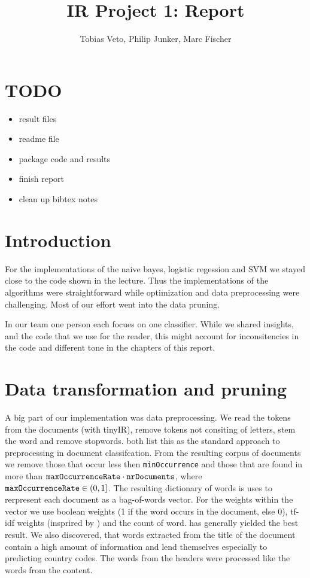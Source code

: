 \documentclass{article}
\title{IR Project 1: Report}
\author{Tobias Veto, Philip Junker, Marc Fischer}
\begin{document}
\section*{TODO}
\begin{itemize}
	\item result files
	\item readme file
	\item package code and results
	\item finish report
	\item clean up bibtex notes
\end{itemize}

 
\section*{Introduction}
For the implementations of the naive bayes, logistic regession and SVM we stayed close to the code shown in the lecture. Thus the implementations of the algorithms were straightforward while optimization and data preprocessing were challenging. Most of our effort went into the data pruning.

In our team one person each focues on one classifier. While we shared insights, and the code that we use for the reader, this might account for inconsitencies in the code and different tone in the chapters of this report.


\section*{Data transformation and pruning}
A big part of our implementation was data preprocessing. We read the tokens from the documents (with tinyIR), remove tokens not consiting of letters, stem the word and remove stopwords. \cite{joachims_text_1998,ozgur_text_2005} both list this as the standard approach to preprocessing in document classifcation. From the resulting corpus of documents we remove those that occur less then \texttt{minOccurrence} and those that are found in more than $\text{\texttt{maxOccurrenceRate}} \cdot \text{\texttt{nrDocuments}}$, where $\text{\texttt{maxOccurrenceRate}} \in (0, 1]$.
The resulting dictionary of words is uses to rerpresent each document as a bag-of-words vector. For the weights within the vector we use boolean weights (1 if the word occurs in the document, else 0), tf-idf weights (insprired by \cite{ozgur_text_2005}) and the count of word.   has generally yielded the best result.
We also discovered, that words extracted from the title of the document contain a high amount of information and lend themselves especially to predicting country codes. The words from the headers were processed like the words from the content.
\end{document}
